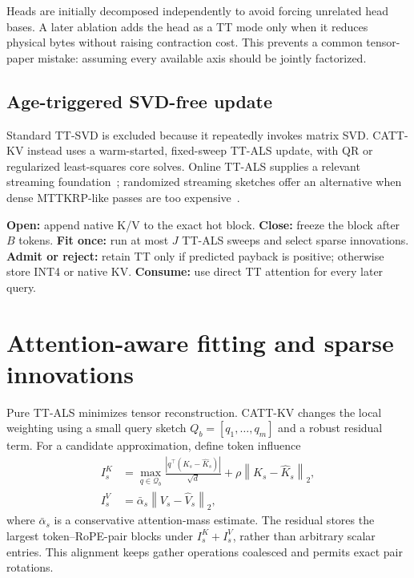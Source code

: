 \documentclass[11pt]{article}
\newcommand{\norm}[1]{\left\lVert #1\right\rVert}
\begin{document}
Heads are initially decomposed independently to avoid forcing unrelated head bases. A later ablation
adds the head as a TT mode only when it reduces physical bytes without raising contraction cost.
This prevents a common tensor-paper mistake: assuming every available axis should be jointly
factorized.

\subsection{Age-triggered SVD-free update}

Standard TT-SVD is excluded because it repeatedly invokes matrix SVD. CATT-KV instead uses a
warm-started, fixed-sweep TT-ALS update, with QR or regularized least-squares core solves. Online
TT-ALS supplies a relevant streaming foundation~\cite{onlinett}; randomized streaming sketches
offer an alternative when dense MTTKRP-like passes are too expensive~\cite{stta}.

\begin{keybox}[title={Block lifecycle}]
\textbf{Open:} append native K/V to the exact hot block. \quad
\textbf{Close:} freeze the block after $B$ tokens. \quad
\textbf{Fit once:} run at most $J$ TT-ALS sweeps and select sparse innovations. \quad
\textbf{Admit or reject:} retain TT only if predicted payback is positive; otherwise store INT4 or
native KV. \quad
\textbf{Consume:} use direct TT attention for every later query.
\end{keybox}

\section{Attention-aware fitting and sparse innovations}
\label{sec:objective}

Pure TT-ALS minimizes tensor reconstruction. CATT-KV changes the local weighting using a small
query sketch $Q_b=[q_1,\ldots,q_m]$ and a robust residual term. For a candidate approximation,
define token influence
\begin{align}
I^K_s &= \max_{q\in\mathcal Q_b}\frac{|q^\top(K_s-\widehat K_s)|}{\sqrt d}
+\rho\norm{K_s-\widehat K_s}_2,\\
I^V_s &= \bar\alpha_s\norm{V_s-\widehat V_s}_2,
\end{align}
where $\bar\alpha_s$ is a conservative attention-mass estimate. The residual stores the largest
token--RoPE-pair blocks under $I_s^K+I_s^V$, rather than arbitrary scalar entries. This alignment
keeps gather operations coalesced and permits exact pair rotations.
\end{document}
